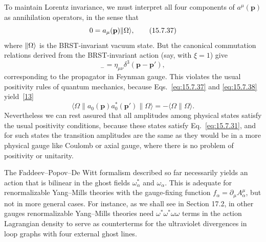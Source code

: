 To maintain Lorentz invariance, we must interpret all four components of $a^\mu(\mathbf p)$ as annihilation operators, in the sense that
\begin{equation}
 0=a_\mu(\mathbf p)\lVert \Omega\rangle,
 \tag{15.7.37}\label{eq:15.7.37}
\end{equation}
where $\lVert \Omega\rangle$ is the BRST-invariant vacuum state. But the canonical commutation relations derived from the BRST-invariant action (say, with $\xi=1$) give
\begin{equation}
 [a_\mu(\mathbf p),a_\nu^*(\mathbf p')]_-=\eta_{\mu\nu}\delta^3(\mathbf p-\mathbf p'),
 \tag{15.7.38}\label{eq:15.7.38}
\end{equation}
corresponding to the propagator in Feynman gauge. This violates the usual positivity rules of quantum mechanics, because Eqs.~\eqref{eq:15.7.37} and \eqref{eq:15.7.38} yield~\hyperref[ch15-ref-13]{[13]}
\begin{equation}
 \langle\Omega\|a_0(\mathbf p)a_0^*(\mathbf p')\|\Omega\rangle=-\langle\Omega\|\Omega\rangle.
 \tag{15.7.39}\label{eq:15.7.39}
\end{equation}
Nevertheless we can rest assured that all amplitudes among physical states satisfy the usual positivity conditions, because these states satisfy Eq.~\eqref{eq:15.7.31}, and for such states the transition amplitudes are the same as they would be in a more physical gauge like Coulomb or axial gauge, where there is no problem of positivity or unitarity.

The Faddeev--Popov--De Witt formalism described so far necessarily yields an action that is bilinear in the ghost fields $\omega_\alpha^*$ and $\omega_\alpha$. This is adequate for renormalizable Yang--Mills theories with the gauge-fixing function $f_\alpha=\partial_\mu A_\alpha^\mu$, but not in more general cases. For instance, as we shall see in Section 17.2, in other gauges renormalizable Yang--Mills theories need $\omega^*\omega^*\omega\omega$ terms in the action Lagrangian density to serve as counterterms for the ultraviolet divergences in loop graphs with four external ghost lines.

